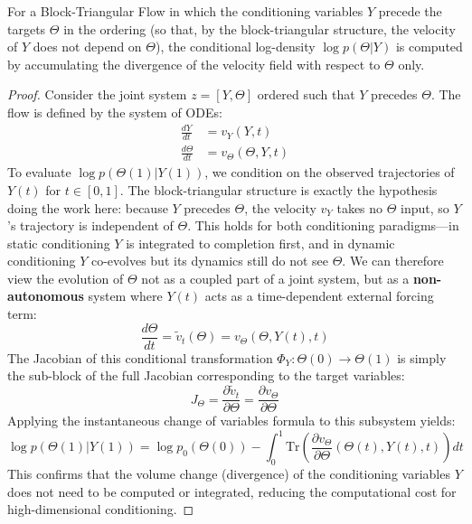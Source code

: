 \begin{proposition}
\label{prop:cond-density}
For a Block-Triangular Flow in which the conditioning variables $Y$ precede the targets $\Theta$ in the ordering (so that, by the block-triangular structure, the velocity of $Y$ does not depend on $\Theta$), the conditional log-density $\log p(\Theta | Y)$ is computed by accumulating the divergence of the velocity field with respect to $\Theta$ only.
\end{proposition}

\begin{proof}
Consider the joint system $z = [Y, \Theta]$ ordered such that $Y$ precedes $\Theta$. The flow is defined by the system of ODEs:
\begin{align}
    \frac{dY}{dt} &= v_Y(Y, t) \\
    \frac{d\Theta}{dt} &= v_\Theta(\Theta, Y, t)
\end{align}
To evaluate $\log p(\Theta(1) | Y(1))$, we condition on the observed trajectories of $Y(t)$ for $t \in [0,1]$.
The block-triangular structure is exactly the hypothesis doing the work here: because $Y$ precedes $\Theta$, the velocity $v_Y$ takes no $\Theta$ input, so $Y$'s trajectory is independent of $\Theta$. This holds for both conditioning paradigms---in static conditioning $Y$ is integrated to completion first, and in dynamic conditioning $Y$ co-evolves but its dynamics still do not see $\Theta$. We can therefore view the evolution of $\Theta$ not as a coupled part of a joint system, but as a \textbf{non-autonomous} system where $Y(t)$ acts as a time-dependent external forcing term:
\begin{equation}
    \frac{d\Theta}{dt} = \tilde{v}_t(\Theta) = v_\Theta(\Theta, Y(t), t)
\end{equation}
The Jacobian of this conditional transformation $\Phi_{Y}: \Theta(0) \to \Theta(1)$ is simply the sub-block of the full Jacobian corresponding to the target variables:
\begin{equation}
    J_{\Theta} = \frac{\partial \tilde{v}_t}{\partial \Theta} = \frac{\partial v_\Theta}{\partial \Theta}
\end{equation}
Applying the instantaneous change of variables formula to this subsystem yields:
\begin{equation}
    \log p(\Theta(1) | Y(1)) = \log p_0(\Theta(0)) - \int_0^1 \text{Tr}\left( \frac{\partial v_\Theta}{\partial \Theta}(\Theta(t), Y(t), t) \right) dt
\end{equation}
This confirms that the volume change (divergence) of the conditioning variables $Y$ does not need to be computed or integrated, reducing the computational cost for high-dimensional conditioning.
\end{proof}

